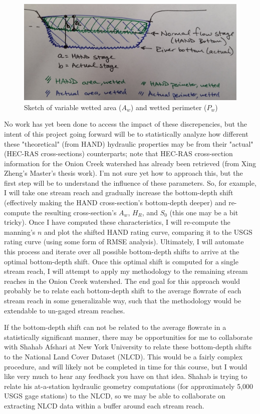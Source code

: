 \documentclass[11pt]{article}
\begin{document}
\begin{figure}[t]
\centering
\includegraphics[keepaspectratio, width=\textwidth]{sketch.png}
\caption{Sketch of variable wetted area ($A_w$) and wetted perimeter ($P_w$)} \label{fig:5}
\end{figure}

\vspace{1ex}

No work has yet been done to access the impact of these discrepencies, but the intent of this project going forward will be to statistically analyze how different these "theoretical" (from HAND) hydraulic properties may be from their "actual" (HEC-RAS cross-sections) counterparts; note that HEC-RAS cross-section information for the Onion Creek watershed has already been retrieved (from Xing Zheng's Master's thesis work). I'm not sure yet how to approach this, but the first step will be to understand the influence of these parameters. So, for example, I will take one stream reach and gradually increase the bottom-depth shift (effectively making the HAND cross-section's bottom-depth deeper) and re-compute the resulting cross-section's $A_w$, $H_R$, and $S_0$ (this one may be a bit tricky). Once I have computed these characteristics, I will re-compute the manning's $n$ and plot the shifted HAND rating curve, comparing it to the USGS rating curve (using some form of RMSE analysis). Ultimately, I will automate this process and iterate over all possible bottom-depth shifts to arrive at the optimal bottom-depth shift. Once this optimal shift is computed for a single stream reach, I will attempt to apply my methodology to the remaining stream reaches in the Onion Creek watershed. The end goal for this approach would probably be to relate each bottom-depth shift to the average flowrate of each stream reach in some generalizable way, such that the methodology would be extendable to un-gaged stream reaches. 

If the bottom-depth shift can not be related to the average flowrate in a statistically significant manner, there may be opportunities for me to collaborate with Shahab Afshari at New York University to relate these bottom-depth shifts to the National Land Cover Dataset (NLCD). This would be a fairly complex procedure, and will likely not be completed in time for this course, but I would like very much to hear any feedback you have on that idea. Shahab is trying to relate his at-a-station hydraulic geometry computations (for approximately 5,000 USGS gage stations) to the NLCD, so we may be able to collaborate on extracting NLCD data within a buffer around each stream reach. 
\end{document}
